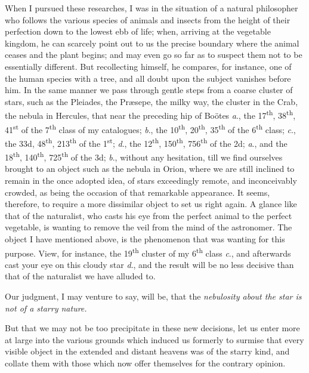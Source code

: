 \documentclass[a4paper, 12pt, oneside, polutonikogreek, english]{article}
\begin{document}
When I pursued these researches, I was in the situation of a natural philosopher who follows the various species of animals and insects from the height of their perfection down to the lowest ebb of life; when, arriving at the vegetable kingdom, he can scarcely point out to us the precise boundary where the animal ceases and the plant begins; and may even go so far as to suspect them not to be essentially different. But recollecting himself, he compares, for instance, one of the human species with a tree, and all doubt upon the subject vanishes before him. In the same manner we pass through gentle steps from a coarse cluster of stars, such as the Pleiades, the Præsepe, the milky way, the cluster in the Crab, the nebula in Hercules, that near the preceding hip of Boötes \emph{a}., the 17\textsuperscript{th}, 38\textsuperscript{th}, 41\textsuperscript{st} of the 7\textsuperscript{th} class of my catalogues; \emph{b}., the 10\textsuperscript{th}, 20\textsuperscript{th}, 35\textsuperscript{th} of the 6\textsuperscript{th} class; \emph{c}., the 33d, 48\textsuperscript{th}, 213\textsuperscript{th} of the 1\textsuperscript{st}; \emph{d}., the 12\textsuperscript{th}, 150\textsuperscript{th}, 756\textsuperscript{th} of the 2d; \emph{a}., and the 18\textsuperscript{th}, 140\textsuperscript{th}, 725\textsuperscript{th} of the 3d; \emph{b}., without any hesitation, till we find ourselves brought to an object such as the nebula in Orion, where we are still inclined to remain in the once adopted idea, of stars exceedingly remote, and inconceivably crowded, as being the occasion of that remarkable appearance. It seems, therefore, to require a more dissimilar object to set us right again. A glance like that of the naturalist, who casts his eye from the perfect animal to the perfect vegetable, is wanting to remove the veil from the mind of the astronomer. The object I have mentioned above, is the phenomenon that was wanting for this purpose. View, for instance, the 19\textsuperscript{th} cluster of my 6\textsuperscript{th} class \emph{c}., and afterwards cast your eye on this cloudy star \emph{d}., and the result will be no less decisive than that of the naturalist we have alluded to.

Our judgment, I may venture to say, will be, that the \emph{nebulosity about the star is not of a starry nature.}

But that we may not be too precipitate in these new decisions, let us enter more at large into the various grounds which induced us formerly to surmise that every visible object in the extended and distant heavens was of the starry kind, and collate them with those which now offer themselves for the contrary opinion.
\end{document}
